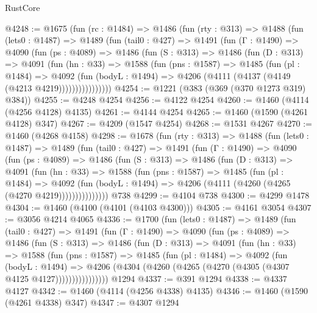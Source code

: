 \begin{lexlean}{RustCore}
\begin{coremodule}
@4248 := @1675
    (fun (rc : @1484) =>
    @1486
      (fun (rty : @313) =>
      @1488
        (fun (lets0 : @1487) =>
        @1489
          (fun (tail0 : @427) =>
          @1491
            (fun (Γ : @1490) =>
            @4090
              (fun (ps : @4089) =>
              @1486
                (fun (S : @313) =>
                @1486
                  (fun (D : @313) =>
                  @4091
                    (fun (hn : @33) =>
                    @1588
                      (fun (pns : @1587) =>
                      @1485
                        (fun (pl : @1484) =>
                        @4092
                          (fun (bodyL : @1494) =>
                          @4206 (@4111 (@4137 (@4149 (@4213 @4219))))))))))))))))
@4254 := @1221 (@383 (@369 (@370 @1273 @319) @384))
@4255 := @4248 @4254
@4256 := @4122 @4254
@4260 := @1460 (@4114 (@4256 @4128) @4135)
@4261 := @4144 @4254
@4265 := @1460 (@1590 (@4261 @4128) @347)
@4267 := @4209 (@1547 @4254)
@4268 := @1531 @4267
@4270 := @1460 (@4268 @4158)
@4298 := @1678
    (fun (rty : @313) =>
    @1488
      (fun (lets0 : @1487) =>
      @1489
        (fun (tail0 : @427) =>
        @1491
          (fun (Γ : @1490) =>
          @4090
            (fun (ps : @4089) =>
            @1486
              (fun (S : @313) =>
              @1486
                (fun (D : @313) =>
                @4091
                  (fun (hn : @33) =>
                  @1588
                    (fun (pns : @1587) =>
                    @1485
                      (fun (pl : @1484) =>
                      @4092
                        (fun (bodyL : @1494) =>
                        @4206 (@4111 (@4260 (@4265 (@4270 @4219)))))))))))))))
    @738
@4299 := @4104 @738
@4300 := @4299 @1478
@4304 := @1460 (@4100 (@4101 (@4103 @4300)))
@4305 := @4161 @3054
@4307 := @3056 @4214 @4065
@4336 := @1700
    (fun (lets0 : @1487) =>
    @1489
      (fun (tail0 : @427) =>
      @1491
        (fun (Γ : @1490) =>
        @4090
          (fun (ps : @4089) =>
          @1486
            (fun (S : @313) =>
            @1486
              (fun (D : @313) =>
              @4091
                (fun (hn : @33) =>
                @1588
                  (fun (pns : @1587) =>
                  @1485
                    (fun (pl : @1484) =>
                    @4092
                      (fun (bodyL : @1494) =>
                      @4206 (@4304 (@4260 (@4265 (@4270 (@4305 (@4307 @4125 @4127))))))))))))))))
    @1294
@4337 := @391 @1294
@4338 := @4337 @4127
@4342 := @1460 (@4114 (@4256 @4338) @4135)
@4346 := @1460 (@1590 (@4261 @4338) @347)
@4347 := @4307 @1294

\end{coremodule}
\end{lexlean}
